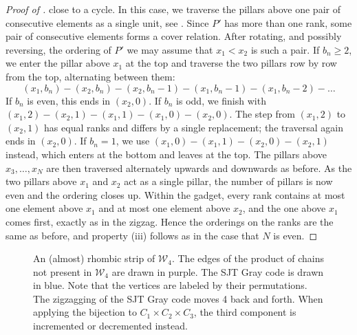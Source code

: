 \documentclass[fontsize=11pt,a4paper,DIV=12]{scrartcl}
\begin{document}
\begin{proof}[Proof of ]
	close to a cycle. In this case, we traverse the pillars above one pair of consecutive elements as a single unit, see . Since $P'$ has more than one rank, some pair of consecutive elements forms a cover relation. After rotating, and possibly reversing, the ordering of $P'$ we may assume that $x_1<x_2$ is such a pair. If $b_n\ge 2$, we enter the pillar above $x_1$ at the top and traverse the two pillars row by row from the top, alternating between them:
	\[(x_1,b_n)-(x_2,b_n)-(x_2,b_n-1)-(x_1,b_n-1)-(x_1,b_n-2)-\ldots\]
	If $b_n$ is even, this ends in $(x_2,0)$. If $b_n$ is odd, we finish with $(x_1,2)-(x_2,1)-(x_1,1)-(x_1,0)-(x_2,0)$. The step from $(x_1,2)$ to $(x_2,1)$ has equal ranks and differs by a single replacement; the traversal again ends in $(x_2,0)$. If $b_n=1$, we use $(x_1,0)-(x_1,1)-(x_2,0)-(x_2,1)$ instead, which enters at the bottom and leaves at the top. The pillars above $x_3,\ldots,x_N$ are then traversed alternately upwards and downwards as before. As the two pillars above $x_1$ and $x_2$ act as a single pillar, the number of pillars is now even and the ordering closes up. Within the gadget, every rank contains at most one element above $x_1$ and at most one element above $x_2$, and the one above $x_1$ comes first, exactly as in the zigzag. Hence the orderings on the ranks are the same as before, and property (iii) follows as in the case that $N$ is even.
\end{proof}

\begin{figure}
	\centering
	
	\caption{An (almost) rhombic strip of $\mathcal W_4$. The edges of the product of chains not present in $\mathcal W_4$ are drawn in purple. The SJT Gray code is drawn in blue. Note that the vertices are labeled by their permutations. The zigzagging of the SJT Gray code moves 4 back and forth. When applying the bijection to $C_1\times C_2\times C_3$, the third component is incremented or decremented instead.}
	\label{fig:weakBruhat4}
\end{figure}
\end{document}
